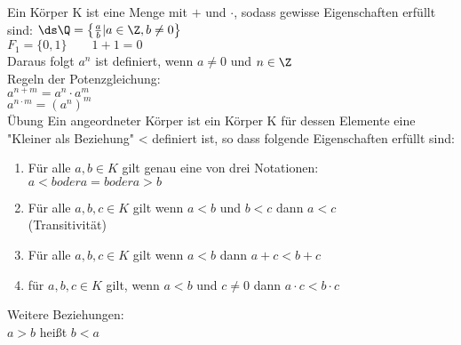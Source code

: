%
\wdh
Ein Körper K ist eine Menge mit $+$ und $\cdot$, sodass gewisse Eigenschaften erfüllt sind:
\bsp
$\ds\Q = \left\{\frac{a}{b} | a \in \Z, b \neq 0\right\}$\\
$F_1 = \{0, 1\} \qquad 1 + 1 = 0$\\
Daraus folgt $a^n$ ist definiert, wenn $a \neq 0$ und $n \in \Z$\\
Regeln der Potenzgleichung:\\
$a^{n+m} = a^n \cdot a^m$\\
$a^{n \cdot m} = (a^{n})^m$\\
\bew
Übung
%
    Ein angeordneter Körper ist ein Körper K für dessen Elemente eine "Kleiner als Beziehung" < definiert ist, so dass folgende Eigenschaften erfüllt sind:\\
    \begin{enumerate}
    \item{Für alle $a, b \in K$ gilt genau eine von drei Notationen:\\
    $a < b oder a = b oder a > b$}
    \item{Für alle $a, b, c \in K$ gilt wenn $a < b$ und $b < c$ dann $a < c$\\ (Transitivität)}
    \item{Für alle $a, b, c \in K$ gilt wenn $a < b$ dann $a + c < b + c$}
    \item{für $a, b, c \in K$ gilt, wenn $a < b$ und $c \neq 0$ dann $a \cdot c < b \cdot c$}
    \end{enumerate}
	Weitere Beziehungen:\\
	$a > b$ heißt $b < a$\\
